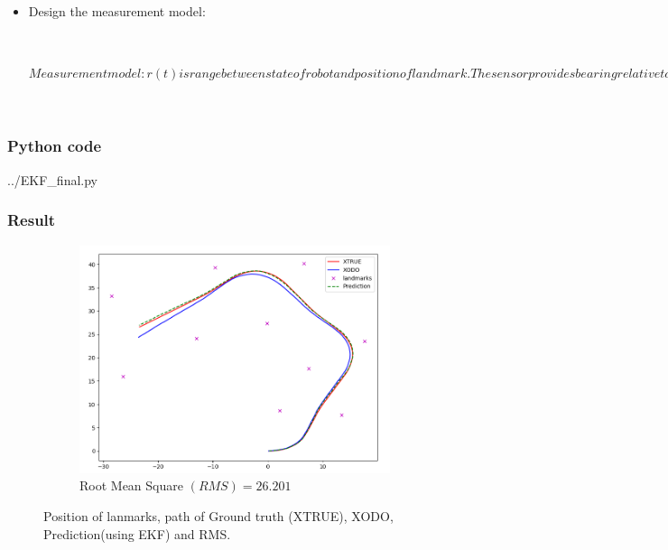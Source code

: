 \documentclass{article}
\begin{document}
\begin{itemize}
	\item{Design the measurement model:} 
	\begin{itemize}

		\begin{subequations}
		Measurement model:
		r(t) is range between state of robot and position of landmark. The sensor provides bearing relative to the orientation of the robot, we subtract the robot's orientation from the bearing to get the sensor reading b(t)
		\begin{align}
			z_t = h\left({x_t}\right)+ \delta_t 	\\		
			r_t = \sqrt{{\left(x_t - x_L\right)}^2 + {\left(y_t - y_L\right)}^2}\\
			b_t = \arctan{\dfrac{y_t - y_L}{x_t - x_L}} + \varphi_t
		\end{align}
		\end{subequations}
		\end{itemize}
\end{itemize}


\pagebreak
\subsubsection{Python code}

{../EKF_final.py}		

\pagebreak
\subsubsection{Result} 
\begin{figure}[h!]
\centering
\begin{subfigure}[b]{0.8\linewidth}
	\includegraphics[width=\textwidth]{../EKF.png}
	\caption{Root Mean Square $(RMS) = 26.201$}\label{fig:image-5}
\end{subfigure}
\caption{Position of lanmarks, path of Ground truth (XTRUE), XODO, Prediction(using EKF) and RMS.}
\end{figure}
\end{document}
